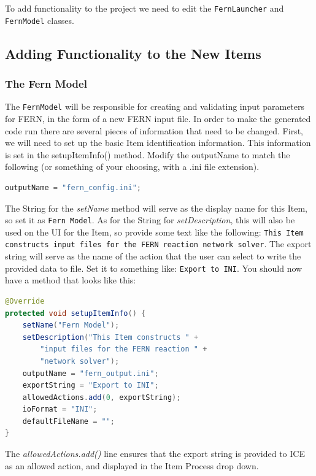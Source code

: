 To add functionality to the project we need to edit
the \texttt{FernLauncher} and \texttt{FernModel} classes.

\subsection{Adding Functionality to the New Items}

\subsubsection{The Fern Model}

The \texttt{FernModel} will be responsible for creating and
validating input parameters for FERN, in the form of a new FERN input file.  In
order to make the generated code run there are several pieces of information that need to be changed.  First, we
will need to set up the basic Item identification information. This information
is set in the setupItemInfo() method. Modify the outputName to match the
following (or something of your choosing, with a .ini file extension).

\begin{lstlisting}[language=Java]
outputName = "fern_config.ini";
\end{lstlisting}

The String for the \emph{setName} method will serve as the display name
for this Item, so set it as \texttt{Fern Model}.
As for the String for \emph{setDescription}, this will also be used on the UI
for the Item, so provide some text like the following: \texttt{This Item constructs input files
for the FERN reaction network solver}. The export string will serve as the name
of the action that the user can select to write the provided data to file. Set
it to something like: \texttt{Export to INI}. You should now have a method that
looks like this:

\begin{lstlisting}[language=Java]
@Override
protected void setupItemInfo() {
	setName("Fern Model");
	setDescription("This Item constructs " +
	    "input files for the FERN reaction " +
	    "network solver"); 
	outputName = "fern_output.ini";   
	exportString = "Export to INI";
	allowedActions.add(0, exportString);
	ioFormat = "INI";
	defaultFileName = "";
}
\end{lstlisting}

The \emph{allowedActions.add()} line ensures that the export string is provided
to ICE as an allowed action, and displayed in the Item Process drop down.

